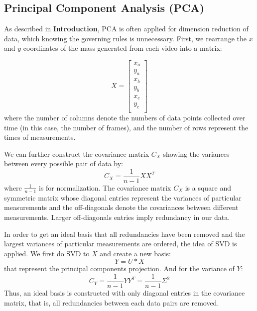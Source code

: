 \documentclass[10pt]{article}
\begin{document}
\subsection{Principal Component Analysis (PCA)}
As described in \textbf{Introduction}, PCA is often applied for dimension reduction of data, which knowing the governing rules is unnecessary. First, we rearrange the $x$ and $y$ coordinates of the mass generated from each video into a matrix:

\begin{equation}\label{2}
X=\left[
\begin{aligned}
x_a \\
y_a \\
x_b \\
y_b \\
x_c \\
y_c \\
\end{aligned}
\right]
\end{equation}
where the number of columns denote the numbers of data points collected over time (in this case, the number of frames), and the number of rows represent the times of measurements. 
\par
\vskip 0.1cm
We can further construct the covariance matrix $C_X$ showing the variances between every possible pair of data by:
\begin{equation}\label{3}
C_X = \frac{1}{n-1}XX^{T}
\end{equation}
where $\frac{1}{n-1}$ is for normalization. The covariance matrix $C_X$ is a square and symmetric matrix whose diagonal entries represent the variances of particular measurements and the off-diagonals denote the covariances between different measurements. Larger off-diagonals entries imply redundancy in our data.
\par
\vskip 0.1cm
In order to get an ideal basis that all redundancies have been removed and the largest variances of particular measurements are ordered, the idea of SVD is applied. We first do SVD to $X$ and create a new basis:
\begin{equation}\label{4}
Y = U*X
\end{equation}
that represent the principal components projection. And for the variance of $Y$:
\begin{equation} \label{5}
C_Y=\frac{1}{n-1}YY^{T}=\frac{1}{n-1}\Sigma^{2}
\end{equation}
Thus, an ideal basis is constructed with only diagonal entries in the covariance matrix, that is, all redundancies between each data pairs are removed.
\end{document}
